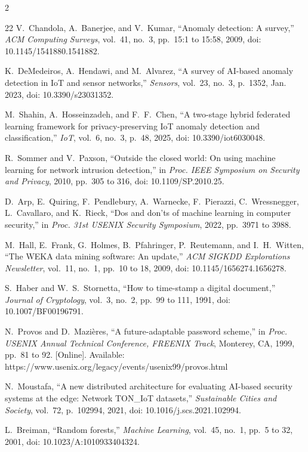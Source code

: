 \documentclass[journal,onecolumn]{IEEEtran}
\begin{document}
\begin{multicols}{2}
\begin{thebibliography}{22}
V.~Chandola, A.~Banerjee, and V.~Kumar, ``Anomaly detection: A survey,'' \emph{ACM Computing Surveys}, vol.~41, no.~3, pp.~15:1 to 15:58, 2009, doi: 10.1145/1541880.1541882.

K.~DeMedeiros, A.~Hendawi, and M.~Alvarez, ``A survey of AI-based anomaly detection in IoT and sensor networks,'' \emph{Sensors}, vol.~23, no.~3, p.~1352, Jan. 2023, doi: 10.3390/s23031352.

M.~Shahin, A.~Hosseinzadeh, and F.~F.~Chen, ``A two-stage hybrid federated learning framework for privacy-preserving IoT anomaly detection and classification,'' \emph{IoT}, vol.~6, no.~3, p.~48, 2025, doi: 10.3390/iot6030048.

R.~Sommer and V.~Paxson, ``Outside the closed world: On using machine learning for network intrusion detection,'' in \emph{Proc. IEEE Symposium on Security and Privacy}, 2010, pp.~305 to 316, doi: 10.1109/SP.2010.25.

D.~Arp, E.~Quiring, F.~Pendlebury, A.~Warnecke, F.~Pierazzi, C.~Wressnegger, L.~Cavallaro, and K.~Rieck, ``Dos and don'ts of machine learning in computer security,'' in \emph{Proc. 31st USENIX Security Symposium}, 2022, pp.~3971 to 3988.

M.~Hall, E.~Frank, G.~Holmes, B.~Pfahringer, P.~Reutemann, and I.~H.~Witten, ``The WEKA data mining software: An update,'' \emph{ACM SIGKDD Explorations Newsletter}, vol.~11, no.~1, pp.~10 to 18, 2009, doi: 10.1145/1656274.1656278.

S.~Haber and W.~S.~Stornetta, ``How to time-stamp a digital document,'' \emph{Journal of Cryptology}, vol.~3, no.~2, pp.~99 to 111, 1991, doi: 10.1007/BF00196791.

N.~Provos and D.~Mazi{\`e}res, ``A future-adaptable password scheme,'' in \emph{Proc. USENIX Annual Technical Conference, FREENIX Track}, Monterey, CA, 1999, pp.~81 to 92. [Online]. Available: https://www.usenix.org/legacy/events/usenix99/provos.html

N.~Moustafa, ``A new distributed architecture for evaluating AI-based security systems at the edge: Network TON\_IoT datasets,'' \emph{Sustainable Cities and Society}, vol.~72, p.~102994, 2021, doi: 10.1016/j.scs.2021.102994.

L.~Breiman, ``Random forests,'' \emph{Machine Learning}, vol.~45, no.~1, pp.~5 to 32, 2001, doi: 10.1023/A:1010933404324.


\end{thebibliography}
\end{multicols}
\end{document}
